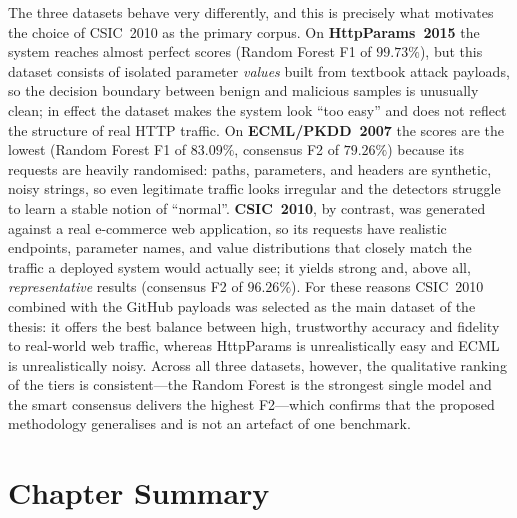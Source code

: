 \documentclass[12pt,a4paper]{report}
\begin{document}
The three datasets behave very differently, and this is precisely what
motivates the choice of CSIC~2010 as the primary corpus. On
\textbf{HttpParams~2015} the system reaches almost perfect scores
(Random Forest F1 of $99.73\%$), but this dataset consists of isolated
parameter \emph{values} built from textbook attack payloads, so the decision
boundary between benign and malicious samples is unusually clean; in effect
the dataset makes the system look ``too easy'' and does not reflect the
structure of real HTTP traffic. On \textbf{ECML/PKDD~2007} the scores are the
lowest (Random Forest F1 of $83.09\%$, consensus F2 of $79.26\%$) because its
requests are heavily randomised: paths, parameters, and headers are
synthetic, noisy strings, so even legitimate traffic looks irregular and the
detectors struggle to learn a stable notion of ``normal''. \textbf{CSIC~2010},
by contrast, was generated against a real e-commerce web application, so its
requests have realistic endpoints, parameter names, and value distributions
that closely match the traffic a deployed system would actually see; it
yields strong and, above all, \emph{representative} results
(consensus F2 of $96.26\%$). For these reasons CSIC~2010 combined with the
GitHub payloads was selected as the main dataset of the thesis: it offers the
best balance between high, trustworthy accuracy and fidelity to real-world
web traffic, whereas HttpParams is unrealistically easy and ECML is
unrealistically noisy. Across all three datasets, however, the qualitative
ranking of the tiers is consistent---the Random Forest is the strongest
single model and the smart consensus delivers the highest F2---which confirms
that the proposed methodology generalises and is not an artefact of one
benchmark.

\section{Chapter Summary}
\label{sec:ch4summary}
\end{document}
